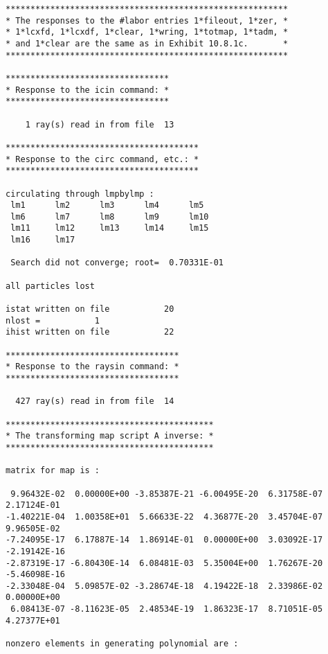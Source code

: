\begin{footnotesize}
\begin{verbatim}
*********************************************************
* The responses to the #labor entries 1*fileout, 1*zer, *
* 1*lcxfd, 1*lcxdf, 1*clear, 1*wring, 1*totmap, 1*tadm, *
* and 1*clear are the same as in Exhibit 10.8.1c.       *
*********************************************************

*********************************
* Response to the icin command: *
*********************************

    1 ray(s) read in from file  13

***************************************
* Response to the circ command, etc.: *
***************************************

circulating through lmpbylmp :
 lm1      lm2      lm3      lm4      lm5
 lm6      lm7      lm8      lm9      lm10
 lm11     lm12     lm13     lm14     lm15
 lm16     lm17

 Search did not converge; root=  0.70331E-01

all particles lost

istat written on file           20
nlost =           1
ihist written on file           22

***********************************
* Response to the raysin command: *
***********************************

  427 ray(s) read in from file  14

******************************************
* The transforming map script A inverse: *
******************************************

matrix for map is :

 9.96432E-02  0.00000E+00 -3.85387E-21 -6.00495E-20  6.31758E-07  2.17124E-01
-1.40221E-04  1.00358E+01  5.66633E-22  4.36877E-20  3.45704E-07  9.96505E-02
-7.24095E-17  6.17887E-14  1.86914E-01  0.00000E+00  3.03092E-17 -2.19142E-16
-2.87319E-17 -6.80430E-14  6.08481E-03  5.35004E+00  1.76267E-20 -5.46098E-16
-2.33048E-04  5.09857E-02 -3.28674E-18  4.19422E-18  2.33986E-02  0.00000E+00
 6.08413E-07 -8.11623E-05  2.48534E-19  1.86323E-17  8.71051E-05  4.27377E+01

nonzero elements in generating polynomial are :


\end{verbatim}
\end{footnotesize}
